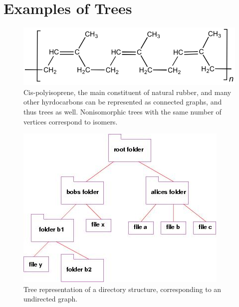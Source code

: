 \documentclass[a4paper,10pt]{article}
\title{}
\author{Zack Garza}
\begin{document}
\section{Examples of Trees}
\begin{figure}[H]
	\begin{centering}
	\begin{center}
	\includegraphics[width=\linewidth]{./Pictures/chemistry.png}
	\caption{Cis-polyisoprene, the main constituent of natural rubber, and many other hyrdocarbons can be represented as connected graphs, and thus trees as well. Nonisomorphic trees with the same number of vertices correspond to isomers.}
	\label{fig:chem}
	\end{center}
	\par\end{centering}
\end{figure}

\begin{figure}[H]
	\begin{centering}
	\begin{center}
	\includegraphics[width=\textwidth]{./Pictures/tree.png}
	\caption{Tree representation of a directory structure, corresponding to an undirected graph.}
	\label{fig:directory}
	\end{center}
	\par\end{centering}
\end{figure}
\end{document}
